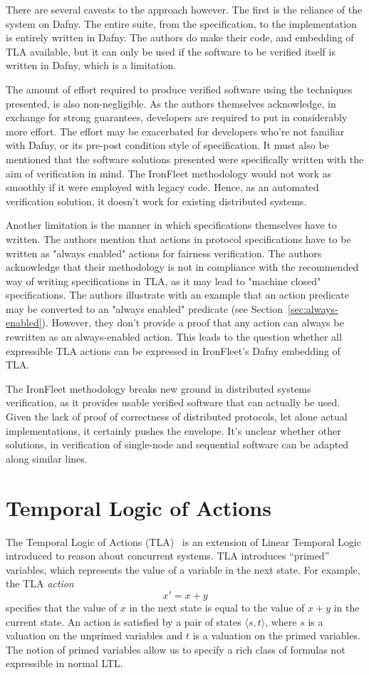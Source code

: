 \documentclass{llncs}
\begin{document}
There are several caveats to the approach however. The first is the reliance of the system on Dafny.
 The entire suite, from the specification, to the implementation is entirely written in Dafny. The 
 authors do make their code, and embedding of TLA available, but it can only be used if the software
 to be verified itself is written in Dafny, which is a limitation. 

 The amount of effort required to produce verified software using the techniques presented, is also 
 non-negligible. As the authors themselves acknowledge, in exchange for strong guarantees, developers
 are required to put in considerably more effort. The effort may be exacerbated for developers who're 
 not familiar with Dafny, or its pre-post condition style of specification. 
 It must also be mentioned that the software solutions presented were specifically written with 
 the aim of verification in mind. The IronFleet methodology would not work as smoothly if it were
 employed with legacy code. Hence, as an automated verification solution, it doesn't work for 
 existing distributed systems. 

 Another limitation is the manner in which specifications themselves have to written. The 
 authors mention that actions in protocol specifications have to be written as "always enabled"
 actions for fairness verification. The authors acknowledge that their methodology is not 
 in compliance with the recommended way of writing specifications in TLA, as it may lead
 to "machine closed" specifications. The authors illustrate with an example that an action
 predicate may be converted to an "always enabled" predicate 
 (see Section~\ref{sec:always-enabled}). However, they don't provide a proof that any
 action can always be rewritten as an always-enabled action. This leads to the question
 whether all expressible TLA actions can be expressed in IronFleet's Dafny embedding of TLA.

 The IronFleet methodology breaks new ground in distributed systems verification, as it 
 provides usable verified software that can actually be used. Given the lack of proof of 
 correctness of distributed protocols, let alone actual implementations, it certainly 
 pushes the envelope. It's unclear whether other solutions, in verification of single-node and
 sequential software can be adapted along similar lines.

 
%
\section{Temporal Logic of Actions}\label{sec:tla}
The Temporal Logic of Actions (TLA)~\cite{tla-lamport} is an extension of Linear Temporal
Logic introduced to reason about concurrent systems. TLA introduces ``primed''
variables, which represents the value of a variable in the next state. For
example, the TLA \textit{action} $$x' = x + y$$ specifies that the value of $x$
in the next state is equal to the value of $x + y$ in the current state. An
action is satisfied by a pair of states $\langle s, t \rangle$, where $s$ is a
valuation on the unprimed variables and $t$ is a valuation on the primed
variables. The notion of primed variables allow us to specify a rich class of
formulas not expressible in normal LTL.
\end{document}

